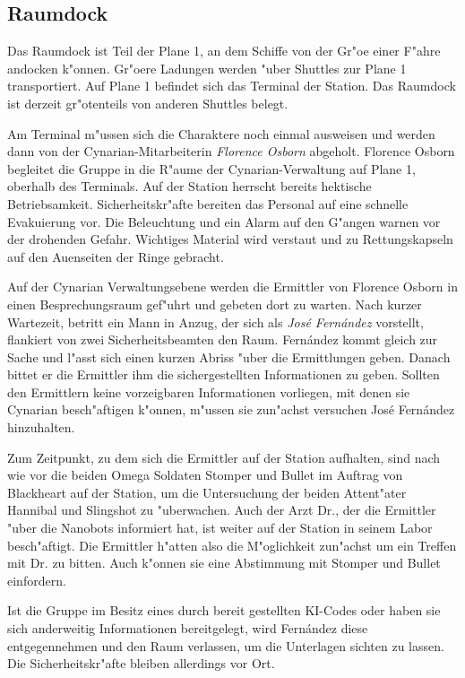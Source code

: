 \subsection{Raumdock}
Das Raumdock ist Teil der Plane 1, an dem Schiffe von der Gr"o\3e einer F"ahre andocken k"onnen. Gr"o\3ere Ladungen werden "uber Shuttles zur Plane 1 transportiert. Auf Plane 1 befindet sich das Terminal der Station. Das Raumdock ist derzeit gr"o\3tenteils von anderen Shuttles belegt.

Am Terminal m"ussen sich die Charaktere noch einmal ausweisen und werden dann von der Cynarian-Mitarbeiterin \emph{Florence Osborn} abgeholt. Florence Osborn begleitet die Gruppe in die R"aume der Cynarian-Verwaltung auf Plane 1, oberhalb des Terminals. Auf der Station herrscht bereits hektische Betriebsamkeit. Sicherheitskr"afte bereiten das Personal auf eine schnelle Evakuierung vor. Die Beleuchtung und ein Alarm auf den G"angen warnen vor der drohenden Gefahr. Wichtiges Material wird verstaut und zu Rettungskapseln auf den Au\3enseiten der Ringe gebracht.

Auf der Cynarian Verwaltungsebene werden die Ermittler von Florence Osborn in einen Besprechungsraum gef"uhrt und gebeten dort zu warten. Nach kurzer Wartezeit, betritt ein Mann in Anzug, der sich als \emph{Jos\'e Fern\'andez} vorstellt, flankiert von zwei Sicherheitsbeamten den Raum. Fern\'andez kommt gleich zur Sache und l"asst sich einen kurzen Abriss "uber die Ermittlungen geben. Danach bittet er die Ermittler ihm die sichergestellten Informationen zu geben. Sollten den Ermittlern keine vorzeigbaren Informationen vorliegen, mit denen sie Cynarian besch"aftigen k"onnen, m"ussen sie zun"achst versuchen Jos\'e Fern\'andez hinzuhalten. 

Zum Zeitpunkt, zu dem sich die Ermittler auf der Station aufhalten, sind nach wie vor die beiden Omega Soldaten Stomper und Bullet im Auftrag von Blackheart auf der Station, um die Untersuchung der beiden Attent"ater Hannibal und Slingshot zu "uberwachen. Auch der Arzt 
Dr.{}, der die Ermittler "uber die Nanobots informiert hat, ist weiter auf der Station in seinem Labor besch"aftigt. Die Ermittler h"atten also die M"oglichkeit zun"achst um ein Treffen mit Dr.{} zu bitten. Auch k"onnen sie eine Abstimmung mit Stomper und Bullet einfordern.

Ist die Gruppe im Besitz eines durch \ml{} bereit gestellten KI-Codes oder haben sie sich anderweitig Informationen bereitgelegt, wird Fern\'andez diese entgegennehmen und den Raum verlassen, um die Unterlagen sichten zu lassen. Die Sicherheitskr"afte bleiben allerdings vor Ort.


